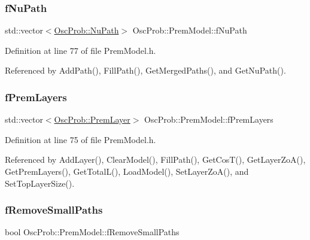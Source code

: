 \subsubsection{\texorpdfstring{f\+Nu\+Path}{fNuPath}}
{\footnotesize\ttfamily std\+::vector$<$\hyperlink{structOscProb_1_1NuPath}{Osc\+Prob\+::\+Nu\+Path}$>$ Osc\+Prob\+::\+Prem\+Model\+::f\+Nu\+Path\hspace{0.3cm}{\ttfamily [protected]}}



Definition at line 77 of file Prem\+Model.\+h.



Referenced by Add\+Path(), Fill\+Path(), Get\+Merged\+Paths(), and Get\+Nu\+Path().

\mbox{\label{classOscProb_1_1PremModel_a19a9a3b23ec154ad7a29f92b74aa5bc6}} 
\subsubsection{\texorpdfstring{f\+Prem\+Layers}{fPremLayers}}
{\footnotesize\ttfamily std\+::vector$<$\hyperlink{structOscProb_1_1PremLayer}{Osc\+Prob\+::\+Prem\+Layer}$>$ Osc\+Prob\+::\+Prem\+Model\+::f\+Prem\+Layers\hspace{0.3cm}{\ttfamily [protected]}}



Definition at line 75 of file Prem\+Model.\+h.



Referenced by Add\+Layer(), Clear\+Model(), Fill\+Path(), Get\+Cos\+T(), Get\+Layer\+Zo\+A(), Get\+Prem\+Layers(), Get\+Total\+L(), Load\+Model(), Set\+Layer\+Zo\+A(), and Set\+Top\+Layer\+Size().

\mbox{\label{classOscProb_1_1PremModel_a3973df6f5f2ff219cd2f865b31aacfd2}} 
\subsubsection{\texorpdfstring{f\+Remove\+Small\+Paths}{fRemoveSmallPaths}}
{\footnotesize\ttfamily bool Osc\+Prob\+::\+Prem\+Model\+::f\+Remove\+Small\+Paths\hspace{0.3cm}{\ttfamily [protected]}}



